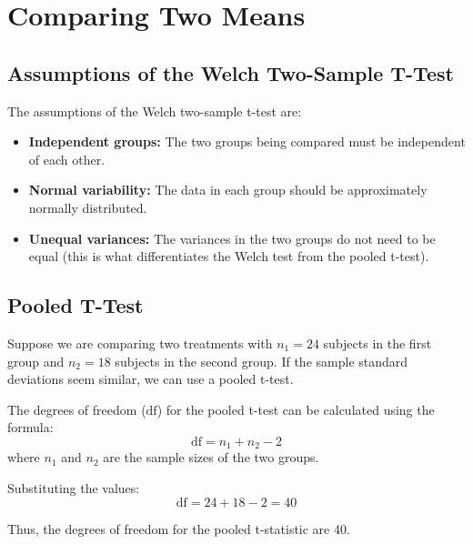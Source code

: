 \documentclass{article}
\begin{document}
\section{Comparing Two Means}

\subsection{Assumptions of the Welch Two-Sample T-Test}

The assumptions of the Welch two-sample t-test are:
\begin{itemize}
    \item \textbf{Independent groups:} The two groups being compared must be independent of each other.
    \item \textbf{Normal variability:} The data in each group should be approximately normally distributed.
    \item \textbf{Unequal variances:} The variances in the two groups do not need to be equal (this is what differentiates the Welch test from the pooled t-test).
\end{itemize}

\subsection{Pooled T-Test}

Suppose we are comparing two treatments with \( n_1 = 24 \) subjects in the first group and \( n_2 = 18 \) subjects in the second group. If the sample standard deviations seem similar, we can use a pooled t-test. 

The degrees of freedom (\( \text{df} \)) for the pooled t-test can be calculated using the formula:
\[
\text{df} = n_1 + n_2 - 2
\]
where \( n_1 \) and \( n_2 \) are the sample sizes of the two groups.

Substituting the values:
\[
\text{df} = 24 + 18 - 2 = 40
\]

Thus, the degrees of freedom for the pooled t-statistic are 40.
\end{document}
